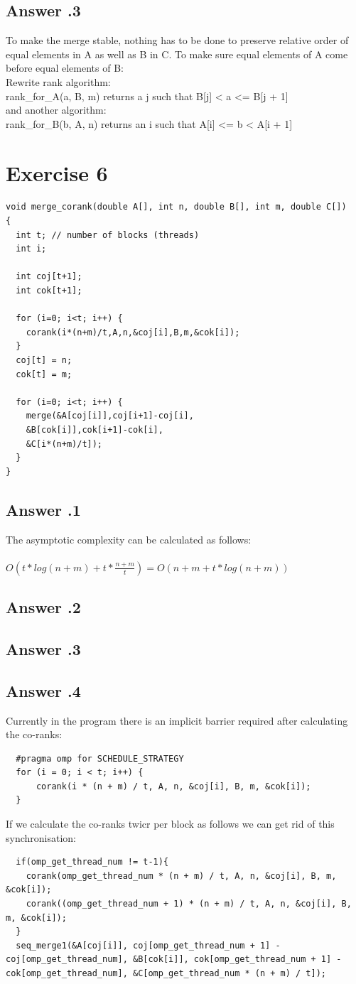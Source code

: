 \documentclass[a4paper,%
11pt,%
DIV=12,
headsepline,%
headings=normal,
]{scrartcl}
\newcounter{curex}
\newcommand{\exercise}[1]{\section*{Exercise #1}\setcounter{curex}{#1}}
\newcommand{\answer}[1]{\subsection*{Answer \arabic{curex}.#1}}
\begin{document}
\answer{3}
To make the merge stable, nothing has to be done to preserve relative order of equal elements in A as well as B in C.
To make sure equal elements of A come before equal elements of B: \\
Rewrite rank algorithm:\\
rank{\_}for{\_}A(a, B, m) returns a j such that B[j] < a <= B[j + 1] \\
and another algorithm: \\
rank{\_}for{\_}B(b, A, n) returns an i such that A[i] <= b < A[i + 1]


\exercise{6}

\begin{lstlisting}
void merge_corank(double A[], int n, double B[], int m, double C[])
{
  int t; // number of blocks (threads)
  int i;
  
  int coj[t+1];
  int cok[t+1];
  
  for (i=0; i<t; i++) {
    corank(i*(n+m)/t,A,n,&coj[i],B,m,&cok[i]);
  }
  coj[t] = n;
  cok[t] = m;
  
  for (i=0; i<t; i++) {
    merge(&A[coj[i]],coj[i+1]-coj[i],
    &B[cok[i]],cok[i+1]-cok[i],
    &C[i*(n+m)/t]);
  }
}
\end{lstlisting}

\answer{1}
The asymptotic complexity can be calculated as follows:\\
\\
$O(t * log(n+m) + t * \frac{n+m}{t}) = O(n+m+t*log(n+m))$
\answer{2}

\answer{3}

\answer{4}
Currently in the program there is an implicit barrier required after calculating the co-ranks:\\
  \begin{lstlisting}
  #pragma omp for SCHEDULE_STRATEGY
  for (i = 0; i < t; i++) {
      corank(i * (n + m) / t, A, n, &coj[i], B, m, &cok[i]);
  }
  \end{lstlisting}
If we calculate the co-ranks twicr per block as follows we can get rid of this synchronisation:
  \begin{lstlisting}
  if(omp_get_thread_num != t-1){
    corank(omp_get_thread_num * (n + m) / t, A, n, &coj[i], B, m, &cok[i]);
    corank((omp_get_thread_num + 1) * (n + m) / t, A, n, &coj[i], B, m, &cok[i]);
  }
  seq_merge1(&A[coj[i]], coj[omp_get_thread_num + 1] - coj[omp_get_thread_num], &B[cok[i]], cok[omp_get_thread_num + 1] - cok[omp_get_thread_num], &C[omp_get_thread_num * (n + m) / t]);
  \end{lstlisting}
\end{document}
